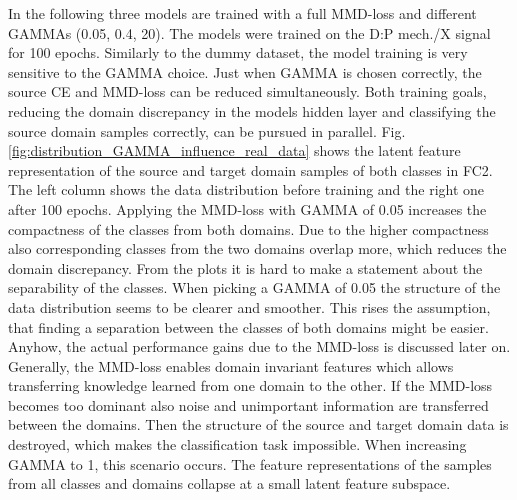 In the following three models are trained with a full MMD-loss and different GAMMAs (0.05, 0.4, 20). The models were trained on the  D:P mech./X signal for 100 epochs. Similarly to the dummy dataset, the model training is very sensitive to the GAMMA choice. Just when GAMMA is chosen correctly, the source CE and MMD-loss can be reduced simultaneously. Both training goals, reducing the domain discrepancy in the models hidden layer and classifying the source domain samples correctly, can be pursued in parallel. Fig. \ref{fig:distribution_GAMMA_influence_real_data} shows the latent feature representation of the source and target domain samples of both classes in FC2. The left column shows the data distribution before training and the right one after 100 epochs. Applying the MMD-loss with GAMMA of 0.05 increases the compactness of the classes from both domains. Due to the higher compactness also corresponding classes from the two domains overlap more, which reduces the domain discrepancy. From the plots it is hard to make a statement about the separability of the classes. When picking a GAMMA of 0.05 the structure of the data distribution seems to be clearer and smoother. This rises the assumption, that finding a separation between the classes of both domains might be easier. Anyhow, the actual performance gains due to the MMD-loss is discussed later on. Generally, the MMD-loss enables  domain invariant features which allows transferring knowledge learned from one domain to the other. If the MMD-loss becomes too dominant also noise and unimportant information are transferred between the domains. Then the structure of the source and target domain data is destroyed, which makes the classification task impossible. When increasing GAMMA to 1, this scenario occurs. The feature representations of the samples from all classes and domains collapse at a small latent feature subspace.

